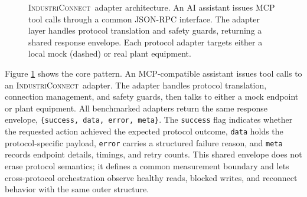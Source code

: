 \documentclass[conference]{IEEEtran}
\newcommand{\system}{\textsc{IndustriConnect}}
\begin{document}
\begin{figure}[t]
{%
    }
    \caption{\system\ adapter architecture. An AI assistant issues MCP tool calls through a common JSON-RPC interface. The adapter layer handles protocol translation and safety guards, returning a shared response envelope. Each protocol adapter targets either a local mock (dashed) or real plant equipment.}
    \label{fig:architecture}
\end{figure}

Figure \ref{fig:architecture} shows the core pattern. An MCP-compatible assistant issues tool calls to an \system\ adapter. The adapter handles protocol translation, connection management, and safety guards, then talks to either a mock endpoint or plant equipment. All benchmarked adapters return the same response envelope,
\texttt{\{success, data, error, meta\}}. The \texttt{success} flag indicates whether the requested action achieved the expected protocol outcome, \texttt{data} holds the protocol-specific payload, \texttt{error} carries a structured failure reason, and \texttt{meta} records endpoint details, timings, and retry counts. This shared envelope does not erase protocol semantics; it defines a common measurement boundary and lets cross-protocol orchestration observe healthy reads, blocked writes, and reconnect behavior with the same outer structure.
\end{document}
